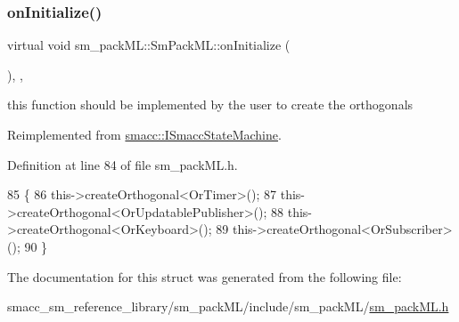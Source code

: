\subsubsection{\texorpdfstring{on\+Initialize()}{onInitialize()}}
{\footnotesize\ttfamily virtual void sm\+\_\+pack\+M\+L\+::\+Sm\+Pack\+M\+L\+::on\+Initialize (\begin{DoxyParamCaption}{ }\end{DoxyParamCaption})\hspace{0.3cm}{\ttfamily [inline]}, {\ttfamily [override]}, {\ttfamily [virtual]}}



this function should be implemented by the user to create the orthogonals 



Reimplemented from \hyperlink{classsmacc_1_1ISmaccStateMachine_ac2982c6c8283663e5e1e8a7c82f511ec}{smacc\+::\+I\+Smacc\+State\+Machine}.



Definition at line 84 of file sm\+\_\+pack\+M\+L.\+h.


\begin{DoxyCode}
85     \{
86         this->createOrthogonal<OrTimer>();
87         this->createOrthogonal<OrUpdatablePublisher>();
88         this->createOrthogonal<OrKeyboard>();
89         this->createOrthogonal<OrSubscriber>();
90     \}
\end{DoxyCode}


The documentation for this struct was generated from the following file\+:\begin{DoxyCompactItemize}
\item 
smacc\+\_\+sm\+\_\+reference\+\_\+library/sm\+\_\+pack\+M\+L/include/sm\+\_\+pack\+M\+L/\hyperlink{sm__packML_8h}{sm\+\_\+pack\+M\+L.\+h}\end{DoxyCompactItemize}

